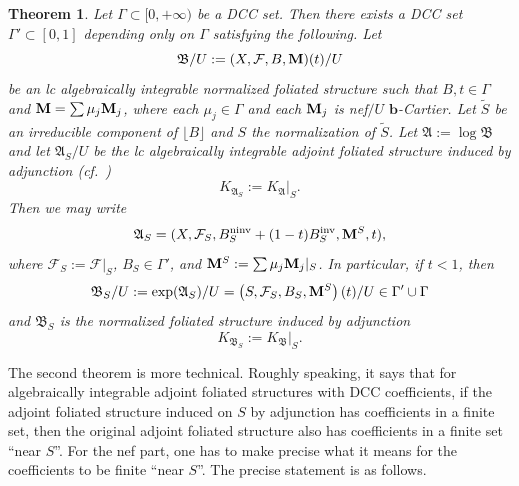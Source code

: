 \documentclass[11pt,reqno]{amsart}
\numberwithin{equation}{section}
\newcommand{\bb}{\bm{b}}
\newcommand{\Mm}{{\bf{M}}}
\newcommand{\ninv}{\operatorname{ninv}}
\newcommand{\inv}{\operatorname{inv}}
\newcommand{\Aa}{{\mathfrak{A}}}
\newcommand{\Bb}{{\mathfrak{B}}}
\newcommand{\Ff}{\mathcal{F}}
\newcommand{\Ii}{\Gamma}
\newtheorem{thm}{Theorem}[section]
\theoremstyle{definition}
\begin{document}
\begin{thm}\label{thm: dcc adjunct to dcc}
Let $\Ii\subset [0,+\infty)$ be a DCC set. Then there exists a DCC set $\Ii'\subset [0,1]$ depending only on $\Ii$ satisfying the following. Let
$$\Bb/U:=(X,\Ff,B,\Mm)(t)/U$$
be an lc algebraically integrable normalized foliated structure such that $B,t\in\Ii$ and $\Mm=\sum\mu_j\Mm_j$, where each $\mu_j\in\Ii$ and each $\Mm_j$ is nef$/U$ $\bb$-Cartier. Let $\widetilde S$ be an irreducible component of $\lfloor B\rfloor$ and $S$ the normalization of $\widetilde S$. Let $\Aa:=\log\Bb$ and let $\Aa_S/U$ be the lc algebraically integrable adjoint foliated structure induced by adjunction (cf.~\cite[Theorem~1.8]{Cas+24})
$$K_{\Aa_S}:=K_{\Aa}|_S.$$
Then we may write
$$\Aa_S=(X,\Ff_S,B_S^{\ninv}+(1-t)B_S^{\inv},\Mm^S,t),$$ 
where $\Ff_S:=\Ff|_S$, $B_S\in\Ii'$, and $\Mm^S:=\sum\mu_j\Mm_j|_S$. In particular, if $t<1$, then
$$\Bb_S/U:=\exp(\Aa_S)/U=\left(S,\Ff_S,B_S,\Mm^S\right)(t)/U\in\Ii'\cup\Ii$$
and $\Bb_S$ is the normalized foliated structure induced by adjunction
$$K_{\Bb_S}:=K_{\Bb}|_S.$$
\end{thm}



The second theorem is more technical. Roughly speaking, it says that for algebraically integrable adjoint foliated structures with DCC coefficients, if the adjoint foliated structure induced on $S$ by adjunction has coefficients in a finite set, then the original adjoint foliated structure also has coefficients in a finite set ``near $S$''. For the nef part, one has to make precise what it means for the coefficients to be finite ``near $S$''. The precise statement is as follows.
\end{document}
